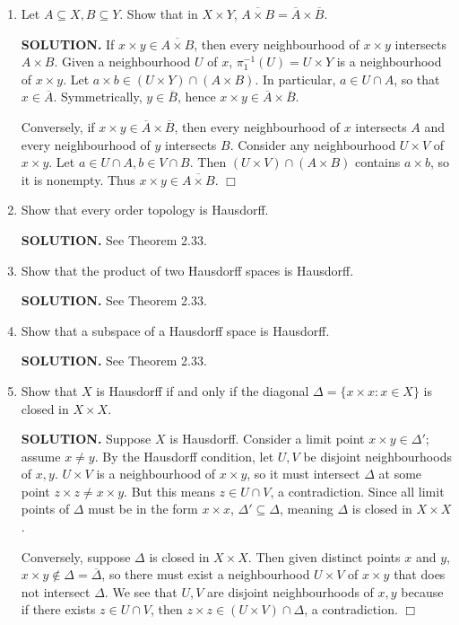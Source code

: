 \documentclass{article}
\begin{document}
\begin{enumerate}
    \item Let $A \subseteq X, B \subseteq Y$. Show that in $X \times Y$, $\overline{A \times B} = \overline{A} \times \overline{B}$.

    {\bf SOLUTION.} If $x \times y \in \overline{A \times B}$, then every neighbourhood of $x \times y$ intersects $A \times B$. Given a neighbourhood $U$ of $x$, $\pi_1^{-1}(U) = U \times Y$ is a neighbourhood of $x \times y$. Let $a \times b \in (U \times Y) \cap (A \times B)$. In particular, $a \in U \cap A$, so that $x \in \overline{A}$. Symmetrically, $y \in \overline{B}$, hence $x \times y \in \overline{A} \times \overline{B}$.
    
    Conversely, if $x \times y \in \overline{A} \times \overline{B}$, then every neighbourhood of $x$ intersects $A$ and every neighbourhood of $y$ intersects $B$. Consider any neighbourhood $U \times V$ of $x \times y$. Let $a \in U \cap A, b \in V \cap B$. Then $(U \times V) \cap (A \times B)$ contains $a \times b$, so it is nonempty. Thus $x \times y \in \overline{A \times B}$. $\Box$

    \item Show that every order topology is Hausdorff.

    {\bf SOLUTION.} See Theorem 2.33.
    
    \item Show that the product of two Hausdorff spaces is Hausdorff.

    {\bf SOLUTION.} See Theorem 2.33.

    \item Show that a subspace of a Hausdorff space is Hausdorff.

    {\bf SOLUTION.} See Theorem 2.33.

    \item Show that $X$ is Hausdorff if and only if the diagonal $\Delta = \{x \times x : x \in X\}$ is closed in $X \times X$.

    {\bf SOLUTION.} Suppose $X$ is Hausdorff. Consider a limit point $x \times y \in \Delta'$; assume $x \neq y$. By the Hausdorff condition, let $U, V$ be disjoint neighbourhoods of $x, y$. $U \times V$ is a neighbourhood of $x \times y$, so it must intersect $\Delta$ at some point $z \times z \neq x \times y$. But this means $z \in U \cap V$, a contradiction. Since all limit points of $\Delta$ must be in the form $x \times x$, $\Delta' \subseteq \Delta$, meaning $\Delta$ is closed in $X \times X$.

    Conversely, suppose $\Delta$ is closed in $X \times X$. Then given distinct points $x$ and $y$, $x \times y \notin \Delta = \overline{\Delta}$, so there must exist a neighbourhood $U \times V$ of $x \times y$ that does not intersect $\Delta$. We see that $U, V$ are disjoint neighbourhoods of $x, y$ because if there exists $z \in U \cap V$, then $z \times z \in (U \times V) \cap \Delta$, a contradiction. $\Box$


\end{enumerate}
\end{document}
